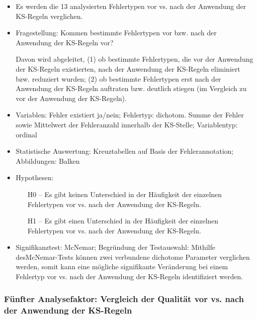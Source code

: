 \begin{itemize}
\item Es werden die 13 analysierten Fehlertypen vor vs. nach der Anwendung der KS-Regeln verglichen.
\item Fragestellung: Kommen bestimmte Fehlertypen vor bzw. nach der Anwendung der KS-Regeln vor?

Davon wird abgeleitet, (1) ob bestimmte Fehlertypen, die vor der Anwendung der KS-Regeln existierten, nach der Anwendung der KS-Regeln eliminiert bzw. reduziert wurden; (2) ob bestimmte Fehlertypen erst nach der Anwendung der KS-Regeln auftraten bzw. deutlich stiegen (im Vergleich zu vor der Anwendung der KS-Regeln).

\item Variablen: Fehler existiert ja/nein; Fehlertyp: dichotom. Summe der Fehler sowie Mittelwert der Fehleranzahl innerhalb der KS-Stelle; Variablentyp: ordinal
\item Statistische Auswertung: Kreuztabellen auf Basis der Fehlerannotation; Abbildungen: Balken
\item Hypothesen:

  \begin{itemize}[align=left]
  \item [H0 --] Es gibt keinen Unterschied in der Häufigkeit der einzelnen Fehlertypen vor vs. nach der Anwendung der KS-Regeln.

  \item [H1 --] Es gibt einen Unterschied in der Häufigkeit der einzelnen Fehlertypen vor vs. nach der Anwendung der KS-Regeln.
  \end{itemize}

\item Signifikanztest: McNemar; Begründung der Testauswahl: Mithilfe des\linebreak McNe\-mar-Tests können zwei verbundene dichotome Parameter verglichen werden, somit kann eine mögliche signifikante Veränderung bei einem Fehlertyp vor vs. nach der Anwendung der KS-Regeln identifiziert werden.
\end{itemize}

\subsubsection{Fünfter Analysefaktor: Vergleich der Qualität vor vs. nach der Anwendung der KS-Regeln}

